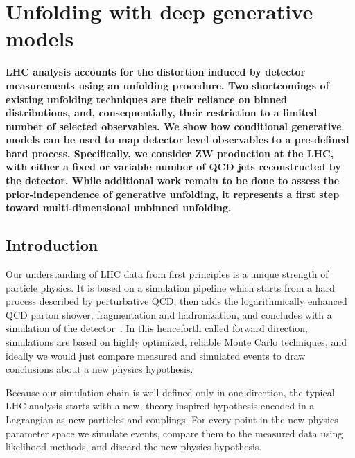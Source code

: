 %
%
%

\chapter{Unfolding with deep generative models}\label{chap:unfolding}
\enlargethispage{2ex}
\vspace*{-2pt}

\enlargethispage{2ex}

{\bf LHC analysis accounts for the distortion induced by detector measurements using an unfolding procedure. Two shortcomings of existing unfolding techniques are their reliance on binned distributions, and, consequentially, their restriction to a limited number of selected observables. We show how conditional generative models can be used to map detector level observables to a pre-defined hard process. Specifically, we consider ZW production at the LHC, with either a fixed or variable number of QCD jets reconstructed by the detector. While additional work remain to be done to assess the prior-independence of generative unfolding, it represents a first step toward multi-dimensional unbinned unfolding.}
  
\section{Introduction}
\label{sec:ganintro}

Our understanding of LHC data from first principles is a unique
strength of particle physics. It is based on a simulation pipeline which
starts from a hard process described by perturbative QCD, then
adds the logarithmically enhanced QCD parton shower, fragmentation
and hadronization, and concludes with a simulation of the detector~\cite{black_book}. 
In this henceforth called forward direction, simulations are based on 
highly optimized, reliable Monte Carlo techniques, and ideally we would 
just compare measured and simulated events to draw conclusions about a
new physics hypothesis.

Because our simulation chain is well defined only in one direction, the typical
LHC analysis starts with a new, theory-inspired hypothesis encoded in
a Lagrangian as new particles and couplings. For every point in the
new physics parameter space we simulate events, compare them to the
measured data using likelihood methods, and discard the new physics
hypothesis. 

